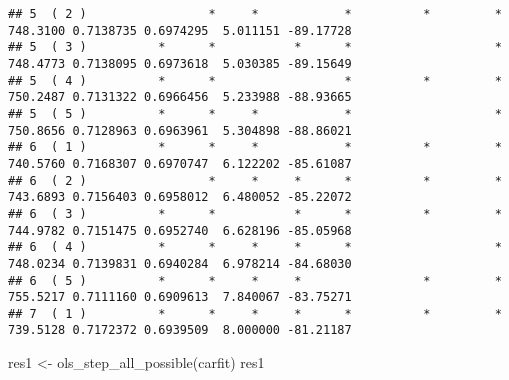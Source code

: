 \documentclass[
]{book}
\newenvironment{Shaded}{\begin{snugshade}}{\end{snugshade}}
\newcommand{\FunctionTok}[1]{\textcolor[rgb]{0.00,0.00,0.00}{#1}}
\newcommand{\NormalTok}[1]{#1}
\newcommand{\OtherTok}[1]{\textcolor[rgb]{0.56,0.35,0.01}{#1}}
\begin{document}
\begin{verbatim}
## 5  ( 2 )                 *     *            *          *         *  748.3100 0.7138735 0.6974295  5.011151 -89.17728
## 5  ( 3 )          *      *           *      *                    *  748.4773 0.7138095 0.6973618  5.030385 -89.15649
## 5  ( 4 )          *      *                  *          *         *  750.2487 0.7131322 0.6966456  5.233988 -88.93665
## 5  ( 5 )          *      *     *            *                    *  750.8656 0.7128963 0.6963961  5.304898 -88.86021
## 6  ( 1 )          *      *     *            *          *         *  740.5760 0.7168307 0.6970747  6.122202 -85.61087
## 6  ( 2 )                 *     *     *      *          *         *  743.6893 0.7156403 0.6958012  6.480052 -85.22072
## 6  ( 3 )          *      *           *      *          *         *  744.9782 0.7151475 0.6952740  6.628196 -85.05968
## 6  ( 4 )          *      *     *     *      *                    *  748.0234 0.7139831 0.6940284  6.978214 -84.68030
## 6  ( 5 )          *      *     *     *                 *         *  755.5217 0.7111160 0.6909613  7.840067 -83.75271
## 7  ( 1 )          *      *     *     *      *          *         *  739.5128 0.7172372 0.6939509  8.000000 -81.21187
\end{verbatim}

\begin{Shaded}
\begin{Highlighting}[]
\NormalTok{res1 }\OtherTok{\textless{}{-}} \FunctionTok{ols\_step\_all\_possible}\NormalTok{(carfit)}
\NormalTok{res1}
\end{Highlighting}
\end{Shaded}
\end{document}
